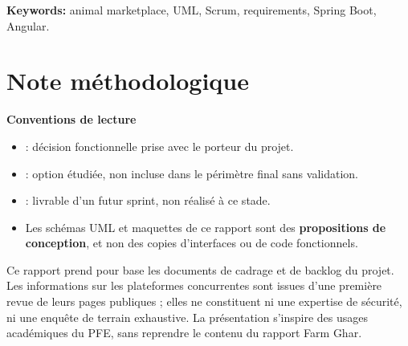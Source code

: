 \noindent\textbf{Keywords:} animal marketplace, UML, Scrum, requirements, Spring Boot, Angular.

\chapter*{Note méthodologique}
\begin{notebox}
\textbf{Conventions de lecture}\par
\begin{itemize}
\item {} : décision fonctionnelle prise avec le porteur du projet.
\item {} : option étudiée, non incluse dans le périmètre final sans validation.
\item {} : livrable d’un futur sprint, non réalisé à ce stade.
\item Les schémas UML et maquettes de ce rapport sont des \textbf{propositions de conception}, et non des copies d’interfaces ou de code fonctionnels.
\end{itemize}
\end{notebox}
Ce rapport prend pour base les documents de cadrage et de backlog du projet. Les informations sur les plateformes concurrentes sont issues d’une première revue de leurs pages publiques ; elles ne constituent ni une expertise de sécurité, ni une enquête de terrain exhaustive. La présentation s’inspire des usages académiques du PFE, sans reprendre le contenu du rapport Farm Ghar.
